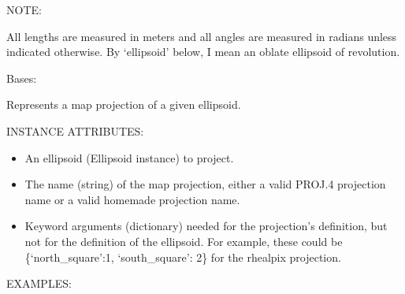\documentclass[a4paper,12ptopenany,oneside,english]{sphinxmanual}
\begin{document}
\sphinxAtStartPar
NOTE:

\sphinxAtStartPar
All lengths are measured in meters and all angles are measured in radians
unless indicated otherwise.
By ‘ellipsoid’ below, I mean an oblate ellipsoid of revolution.

\begin{fulllineitems}
\label{\detokenize{projection_wrapper:rhealpixdggs.projection_wrapper.Projection}}
\pysigstartsignatures
\pysiglinewithargsret
{}
{\sphinxparamcomma {}\sphinxparamcomma {}}
{}
\pysigstopsignatures
\sphinxAtStartPar
Bases: 

\sphinxAtStartPar
Represents a map projection of a given ellipsoid.

\sphinxAtStartPar
INSTANCE ATTRIBUTES:
\begin{itemize}
\item {} 
\sphinxAtStartPar
{} \sphinxhyphen{} An ellipsoid (Ellipsoid instance) to project.

\item {} 
\sphinxAtStartPar
{} \sphinxhyphen{} The name (string) of the map projection, either a valid PROJ.4
projection name or a valid homemade projection name.

\item {} 
\sphinxAtStartPar
{} \sphinxhyphen{} Keyword arguments (dictionary) needed for the projection’s
definition, but not for the definition of the ellipsoid.  For example,
these could be \{‘north\_square’:1, ‘south\_square’: 2\} for the rhealpix
projection.

\end{itemize}

\sphinxAtStartPar
EXAMPLES:


\end{fulllineitems}
\end{document}
